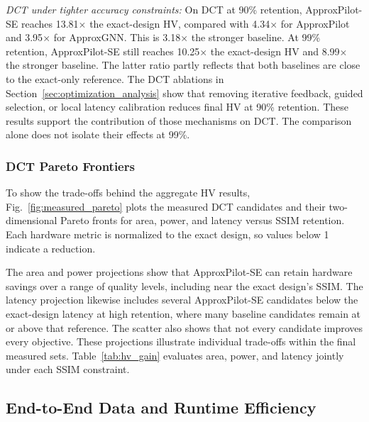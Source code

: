 \noindent\textit{DCT under tighter accuracy constraints:}
On DCT at 90\% retention, ApproxPilot-SE reaches 13.81$\times$ the exact-design HV, compared with 4.34$\times$ for ApproxPilot and 3.95$\times$ for ApproxGNN. This is 3.18$\times$ the stronger baseline. At 99\% retention, ApproxPilot-SE still reaches 10.25$\times$ the exact-design HV and 8.99$\times$ the stronger baseline. The latter ratio partly reflects that both baselines are close to the exact-only reference. The DCT ablations in Section~\ref{sec:optimization_analysis} show that removing iterative feedback, guided selection, or local latency calibration reduces final HV at 90\% retention. These results support the contribution of those mechanisms on DCT. The comparison alone does not isolate their effects at 99\%.






\subsubsection{DCT Pareto Frontiers}
To show the trade-offs behind the aggregate HV results, Fig.~\ref{fig:measured_pareto} plots the measured DCT candidates and their two-dimensional Pareto fronts for area, power, and latency versus SSIM retention. Each hardware metric is normalized to the exact design, so values below 1 indicate a reduction.




The area and power projections show that ApproxPilot-SE can retain hardware savings over a range of quality levels, including near the exact design's SSIM. The latency projection likewise includes several ApproxPilot-SE candidates below the exact-design latency at high retention, where many baseline candidates remain at or above that reference. The scatter also shows that not every candidate improves every objective. These projections illustrate individual trade-offs within the final measured sets. Table~\ref{tab:hv_gain} evaluates area, power, and latency jointly under each SSIM constraint.













\subsection{End-to-End Data and Runtime Efficiency}
\label{sec:data_runtime_efficiency}

